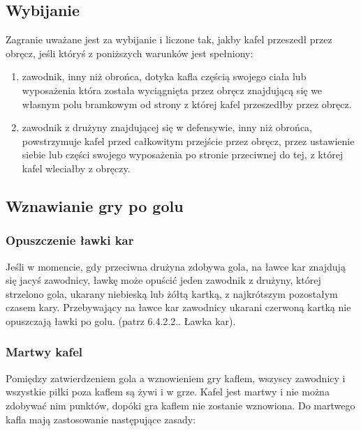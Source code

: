 \documentclass[12pt]{article}
\begin{document}
\subsection{Wybijanie}

Zagranie uważane jest za wybijanie i liczone tak, jakby kafel przeszedł
przez obręcz, jeśli któryś z poniższych warunków jest spełniony:

\begin{enumerate}
	\item
	      zawodnik, inny niż obrońca, dotyka kafla częścią swojego ciała lub
	      wyposażenia która została wyciągnięta przez obręcz znajdującą się we
	      własnym polu bramkowym od strony z której kafel przeszedłby przez
	      obręcz.
	\item
	      zawodnik z drużyny znajdującej się w defensywie, inny niż obrońca,
	      powstrzymuje kafel przed całkowitym przejście przez obręcz, przez
	      ustawienie siebie lub części swojego wyposażenia po stronie przeciwnej
	      do tej, z której kafel wleciałby z obręczy.
\end{enumerate}

\subsection{Wznawianie gry po golu}

\subsubsection{Opuszczenie ławki kar}
Jeśli w momencie, gdy przeciwna
drużyna zdobywa gola, na ławce kar znajdują się jacyś zawodnicy, ławkę
może opuścić jeden zawodnik z drużyny, której strzelono gola, ukarany
niebieską lub żółtą kartką, z najkrótszym pozostałym czasem kary.
Przebywający na ławce kar zawodnicy ukarani czerwoną kartką nie
opuszczają ławki po golu. (patrz 6.4.2.2.. Ławka kar).

\subsubsection{Martwy kafel}
Pomiędzy zatwierdzeniem gola a wznowieniem
gry kaflem, wszyscy zawodnicy i wszystkie piłki poza kaflem są żywi i w
grze. Kafel jest martwy i nie można zdobywać nim punktów, dopóki gra
kaflem nie zostanie wznowiona. Do martwego kafla mają zastosowanie
następujące zasady:
\end{document}
